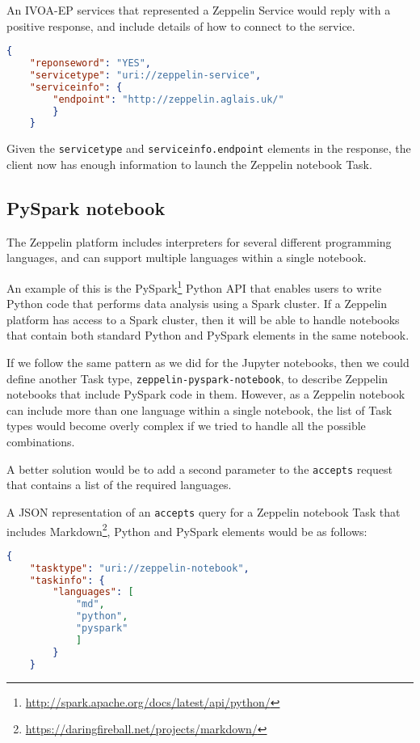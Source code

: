 \documentclass[11pt,a4paper]{ivoa}
\newcommand{\json} {JSON\xspace}
\newcommand{\ivoep} {IVOA-EP\xspace}
\newcommand{\jupyter} {Jupyter\xspace}
\newcommand{\spark} {Spark\xspace}
\newcommand{\python} {Python\xspace}
\newcommand{\pyspark} {PySpark\xspace}
\newcommand{\markdown} {Markdown\xspace}
\newcommand{\zeppelin} {Zeppelin\xspace}
\newcommand{\codeword}[1] {\texttt{#1}}
\newcommand{\footurl}[1] {\footnote{\url{#1}}}
\begin{document}
An \ivoep services that represented a \zeppelin Service would reply with a positive response, and include details of how to connect to the service.
\begin{lstlisting}[language=json]
    {
    "reponseword": "YES",
    "servicetype": "uri://zeppelin-service",
    "serviceinfo": {
        "endpoint": "http://zeppelin.aglais.uk/"
        }
    }
\end{lstlisting}

Given the \codeword{servicetype} and \codeword{serviceinfo.endpoint} elements in the response, the client now has enough information to launch the \zeppelin notebook Task.

\subsection{PySpark notebook}
\label{sec:pyspark-notebook}

The \zeppelin platform includes interpreters for several different programming languages, and can support multiple languages within a single notebook.

An example of this is the \pyspark \footurl{http://spark.apache.org/docs/latest/api/python/} \python API that enables users to write \python code that performs data analysis using a \spark cluster.
If a \zeppelin platform has access to a \spark cluster, then it will be able to handle notebooks that contain both standard \python and \pyspark elements in the same notebook.

If we follow the same pattern as we did for the \jupyter notebooks, then we could define another Task type, \codeword{zeppelin-pyspark-notebook}, to describe \zeppelin notebooks that include \pyspark code in them.
However, as a \zeppelin notebook can include more than one language within a single notebook, the list of Task types would become overly complex if we tried to handle all the possible combinations.

A better solution would be to add a second parameter to the \codeword{accepts} request that contains a list of the required languages.

A \json representation of an \codeword{accepts} query for a \zeppelin notebook Task that includes \markdown\footurl{https://daringfireball.net/projects/markdown/}, \python and \pyspark elements would be as follows:
\begin{lstlisting}[language=json]
    {
    "tasktype": "uri://zeppelin-notebook",
    "taskinfo": {
        "languages": [
            "md",
            "python",
            "pyspark"
            ]
        }
    }
\end{lstlisting}
\end{document}
